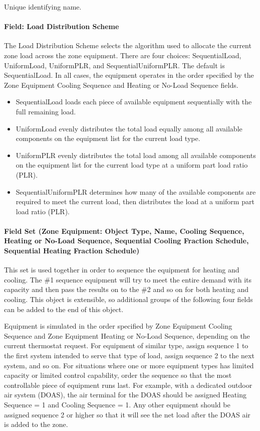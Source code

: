 Unique identifying name.

\paragraph{Field: Load Distribution Scheme}

The Load Distribution Scheme selects the algorithm used to allocate the current zone load across the zone equipment. There are four choices: SequentialLoad, UniformLoad, UniformPLR, and SequentialUniformPLR. The default is SequentialLoad. In all cases, the equipment operates in the order specified by the Zone Equipment Cooling Sequence and Heating or No-Load Sequence fields.

\begin{itemize}
\item
  SequentialLoad loads each piece of available equipment sequentially with the full remaining load.
\item
  UniformLoad evenly distributes the total load equally among all available components on the equipment list for the current load type.
\item
  UniformPLR evenly distributes the total load among all available components on the equipment list for the current load type at a uniform part load ratio (PLR).
\item
  SequentialUniformPLR determines how many of the available components are required to meet the current load, then distributes the load at a uniform part load ratio (PLR).
\end{itemize}
\paragraph{Field Set (Zone Equipment: Object Type, Name, Cooling Sequence, Heating or No-Load Sequence, Sequential Cooling Fraction Schedule, Sequential Heating Fraction Schedule)}\label{field-set-zone-equipment-object-type-name-cooling-sequence-heating-or-no-load-sequence}

This set is used together in order to sequence the equipment for heating and cooling. The \#1 sequence equipment will try to meet the entire demand with its capacity and then pass the results on to the \#2 and so on for both heating and cooling. This object is extensible, so additional groups of the following four fields can be added to the end of this object.

Equipment is simulated in the order specified by Zone Equipment Cooling Sequence and Zone Equipment Heating or No-Load Sequence, depending on the current thermostat request. For equipment of similar type, assign sequence 1 to the first system intended to serve that type of load, assign sequence 2 to the next system, and so on. For situations where one or more equipment types has limited capacity or limited control capability, order the sequence so that the most controllable piece of equipment runs last. For example, with a dedicated outdoor air system (DOAS), the air terminal for the DOAS should be assigned Heating Sequence = 1 and Cooling Sequence = 1. Any other equipment should be assigned sequence 2 or higher so that it will see the net load after the DOAS air is added to the zone.

